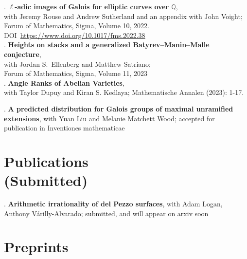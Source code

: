 \documentclass[margin,line]{res}
\newcounter{pubs}
\begin{document}
\begin{resume}
 .  \textbf{$\ell$-adic images of Galois for elliptic curves over $\mathbb{Q}$},\\
with Jeremy Rouse and Andrew Sutherland and an appendix with John Voight;\\
Forum of Mathematics, Sigma, Volume 10, 2022. DOI~\url{https://www.doi.org/10.1017/fms.2022.38}
\medskip\\
 .  \textbf{Heights on stacks and a generalized Batyrev--Manin--Malle conjecture},\\
with Jordan S.~Ellenberg and Matthew Satriano;\\
Forum of Mathematics, Sigma, Volume 11, 2023
\medskip\\
 .  \textbf{Angle Ranks of Abelian Varieties},\\ with Taylor Dupuy and Kiran S. Kedlaya; Mathematische Annalen (2023): 1-17.

 .  \textbf{A predicted distribution for Galois groups of maximal unramified extensions}, with Yuan Liu and Melanie Matchett Wood; accepted for publication in Inventiones mathematicae







\vspace{-7pt}
\section{\sc Publications \\ {(Submitted)}}

 .  \textbf{Arithmetic irrationality of del Pezzo surfaces}, with Adam Logan, Anthony V\'arilly-Alvarado; submitted, and will appear on arxiv soon


\section{\sc Preprints}


\end{resume}
\end{document}
